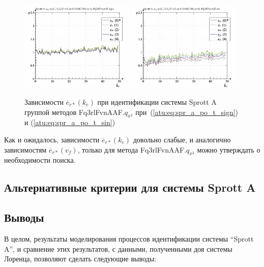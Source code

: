\begin{figure}[htb!]
  \centerline{
    \includegraphics[width=0.49\textwidth]{p/cha/spr_a/Fq3rlFvnAAF_x2/sprott_a_id-p_k_e_sign.png}
    \hfill
    \includegraphics[width=0.49\textwidth]{p/cha/spr_a/Fq3rlFvnAAF_x2/sprott_a_id-p_k_e_sin.png}
  }
  \caption{Зависимости $\overline{e}_{r*}(k_e)$ при идентификации системы Sprott A группой методов Fq3rlFvnAAF.$q_{x^2}$
   при~(\ref{atu:eq:spr_a_po_t_sign}) и (\ref{atu:eq:spr_a_po_t_sin})}
  \label{atu:f:spr_a_k_e_Fq3rlFvnAAF_q_x2}
\end{figure}

Как и ожидалось, зависимости $\overline{e}_{r*}(k_e)$
довольно слабые, и аналогично зависимостям  $\overline{e}_{r*}(v_f)$,
только для метода Fq3rlFvnAAF.$q_{x^2}$ можно
утверждать о необходимости поиска.


\subsection{Альтернативные критерии для системы Sprott A}   %



\subsection{Выводы}  %

В целом, результаты моделирования процессов идентификации системы ``Sprott A'',
и сравнение этих результатов, с данными, полученными
доя системы Лоренца, позволяют сделать следующие выводы:

